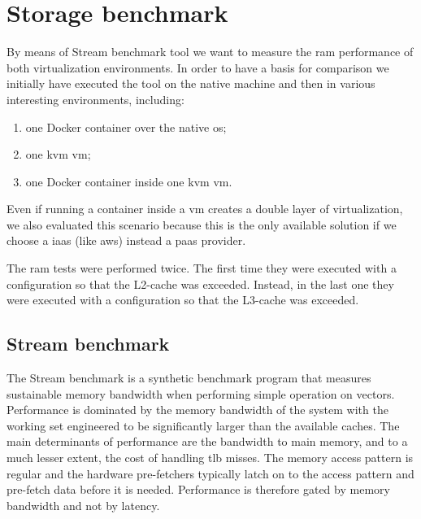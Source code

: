 %
%
\section{Storage benchmark}
\label{sec:measurements-storage}
By means of Stream benchmark tool we want to measure the \acs{ram} performance of both virtualization
environments. In order to have a basis for comparison we initially have executed the tool on the native
machine and then in various interesting environments, including:

\begin{enumerate}
	\item{one Docker container over the native \acs{os};}
	\item{one \ac{kvm} \ac{vm};}
	\item{one Docker container inside one \ac{kvm} \ac{vm}.}
\end{enumerate}

Even if running a container inside a \ac{vm} creates a double layer of virtualization, we also evaluated
this scenario because this is the only available solution if we choose a \ac{iaas} (like \ac{aws}) instead
a \ac{paas} provider.

The \acs{ram} tests were performed twice. The first time they were executed with a configuration so that
the L2-cache was exceeded. Instead, in the last one they were executed with a configuration so that the
L3-cache was exceeded.

\subsection{Stream benchmark}
\label{sec:measurements-storage-stream}
The Stream benchmark is a synthetic benchmark program that measures sustainable memory bandwidth when
performing simple operation on vectors. Performance is dominated by the memory bandwidth of the system
with the working set engineered to be significantly larger than the available caches. The main determinants
of performance are the bandwidth to main memory, and to a much lesser extent, the cost of handling 
\ac{tlb} misses. The memory access pattern is regular and the hardware pre-fetchers typically latch on
to the access pattern and pre-fetch data before it is needed. Performance is therefore gated by memory
bandwidth and not by latency.

